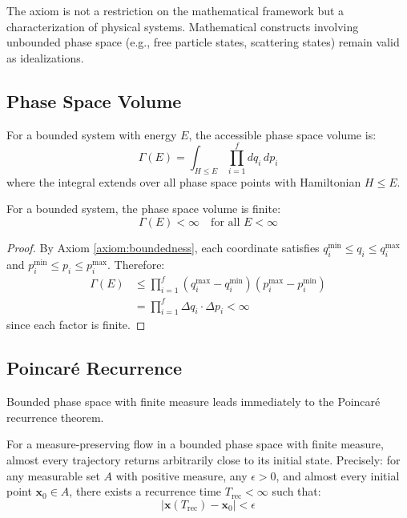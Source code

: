 \begin{remark}
The axiom is not a restriction on the mathematical framework but a characterization of physical systems. Mathematical constructs involving unbounded phase space (e.g., free particle states, scattering states) remain valid as idealizations.
\end{remark}

\subsection{Phase Space Volume}

\begin{definition}
For a bounded system with energy $E$, the accessible phase space volume is:
\begin{equation}
\Gamma(E) = \int_{H \leq E} \prod_{i=1}^{f} dq_i \, dp_i
\label{eq:phase_volume}
\end{equation}
where the integral extends over all phase space points with Hamiltonian $H \leq E$.
\end{definition}

\begin{proposition}
\label{prop:finite_measure}
For a bounded system, the phase space volume is finite:
\begin{equation}
\Gamma(E) < \infty \quad \text{for all } E < \infty
\end{equation}
\end{proposition}

\begin{proof}
By Axiom \ref{axiom:boundedness}, each coordinate satisfies $q_i^{\min} \leq q_i \leq q_i^{\max}$ and $p_i^{\min} \leq p_i \leq p_i^{\max}$. Therefore:
\begin{align}
\Gamma(E) &\leq \prod_{i=1}^{f} (q_i^{\max} - q_i^{\min})(p_i^{\max} - p_i^{\min}) \\
&= \prod_{i=1}^{f} \Delta q_i \cdot \Delta p_i < \infty
\end{align}
since each factor is finite.
\end{proof}

\subsection{Poincar\'{e} Recurrence}

Bounded phase space with finite measure leads immediately to the Poincar\'{e} recurrence theorem.

\begin{theorem}
\label{thm:poincare}
For a measure-preserving flow in a bounded phase space with finite measure, almost every trajectory returns arbitrarily close to its initial state. Precisely: for any measurable set $A$ with positive measure, any $\epsilon > 0$, and almost every initial point $\mathbf{x}_0 \in A$, there exists a recurrence time $T_{\text{rec}} < \infty$ such that:
\begin{equation}
|\mathbf{x}(T_{\text{rec}}) - \mathbf{x}_0| < \epsilon
\end{equation}
\end{theorem}

